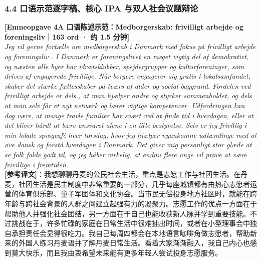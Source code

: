 \subsubsection*{4.4 口语示范逐字稿、核心 IPA 与双人社会议题辩论}

\begin{transbox}
\small
\textbf{\color{NCDNavy}[Emneopgave 4A 口语陈述示范：Medborgerskab: frivilligt arbejde og foreningsliv｜163 ord · 约 1.5 分钟]}\\
\textit{Jeg vil gerne fortælle om medborgerskab i Danmark med fokus på frivilligt arbejde og foreningsliv . I Danmark er foreningslivet en meget vigtig del af demokratiet, og næsten alle byer har idrætsklubber, spejdergrupper og kulturforeninger, som drives af engagerede frivillige. Når borgere engagerer sig gratis i lokalsamfundet, skaber det stærke fællesskaber på tværs af alder og social baggrund. Fordelen ved frivilligt arbejde er dels , at man hjælper andre og styrker sammenholdet, og dels at man selv får et nyt netværk og lærer vigtige kompetencer. Udfordringen  kan dog være, at mange travle familier har svært ved at finde tid i hverdagen, eller at det bliver hårdt at bære ansvaret alene i en lille bestyrelse. Selv er jeg frivillig  i min lokale sprogcafé hver torsdag, hvor jeg hjælper nyankomne udlændinge med at øve dansk og forstå hverdagen i Danmark. Det giver mig personligt stor glæde at se folk falde godt til, og jeg håber virkelig, at endnu flere unge vil prøve at være frivillige i fremtiden.}\\[4pt]
\textbf{\color{NCDTeal}[参考译文]}：我想聊聊丹麦的公民社会生活，重点是志愿工作与社团生活。在丹麦，社团生活是民主制度中非常重要的一部分，几乎每座城镇都有由热心志愿者运营的体育俱乐部、童子军团体和文化协会。当市民无偿投身地方社区时，就能在跨年龄与跨社会背景的人群之间建立起强有力的凝聚力。志愿工作的优点一方面在于帮助他人并强化社会团结，另一方面在于自己也能收获新人脉并学到重要技能。不过挑战在于，许多忙碌的家庭在日常生活中很难抽出时间，或者在小型理事会中独自承担责任会显得很吃力。我自己每周四都会在本地语言咖啡角做志愿者，帮助新来的外国人练习丹麦语并了解丹麦日常生活。看着大家渐渐融入，我自己内心也感到莫大快乐，而且我由衷希望未来能有更多年轻人尝试投身志愿服务。
\end{transbox}

